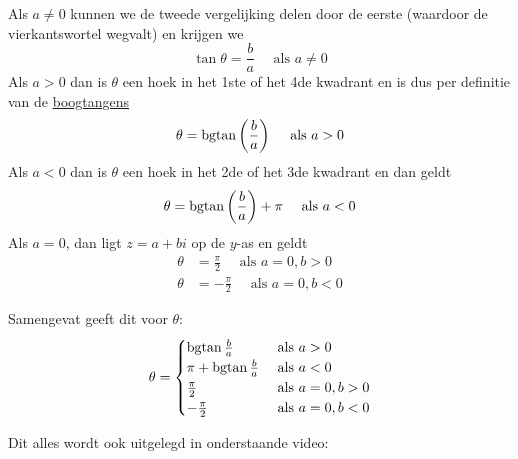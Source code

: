 \documentclass{ximera}
\begin{document}
 
 

 

 
 
\begin{remark}\nl
     
    Als $a \neq 0$ kunnen we de tweede vergelijking delen door de eerste (waardoor de vierkantswortel wegvalt) en krijgen we
    $$
    \tan \theta = \frac{b}{a}  \quad \text{ als } a \neq 0
    $$
    Als $a >0$ dan is $\theta$ een hoek in het 1ste of het 4de kwadrant en is dus per definitie van de \hyperref[xim:cyclometrische_functies]{boogtangens }
    $$
    \theta  =  \operatorname{bgtan} \left(\frac{b}{a}\right) \quad \text{ als }  a>0
    $$
    Als $a<0$ dan is $\theta$ een hoek in het 2de of het 3de kwadrant en dan geldt
    $$
    \theta  =  \operatorname{bgtan} \left(\frac{b}{a}\right) + \pi \quad \text{ als }  a<0
    $$
    Als $a=0$, dan ligt $z=a+bi$ op de $y$-as en geldt
    \begin{align*}
    \theta & =  \frac{\pi}{2}  \quad\text{ als } a=0, b > 0\\
    \theta & = -\frac{\pi}{2} \quad\text{ als } a=0, b < 0
    \end{align*}
     
    Samengevat geeft dit voor $\theta$:
    $$
    \theta = \begin{cases}
    \bgtan \frac{b}{a}       & \text{ als } a>0        \\
    \pi + \bgtan \frac{b}{a} & \text{ als } a<0        \\   %
    \frac{\pi}{2}            & \text{ als } a=0, b > 0 \\
    -\frac{\pi}{2}           & \text{ als } a=0, b < 0
    \end{cases}
    $$
    \begin{basicSkip}
Dit alles wordt ook uitgelegd in onderstaande video:
 
\end{basicSkip}
 
\end{remark}
 
 
 
\nl
 
\end{document}
